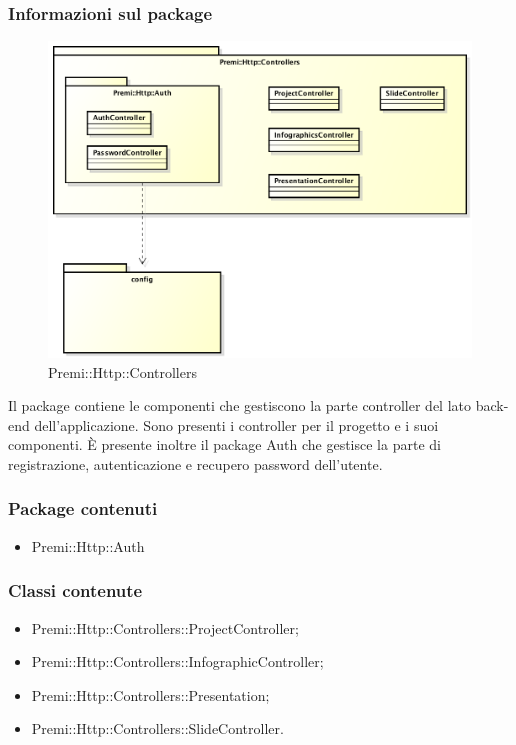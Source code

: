 	\subsubsection*{Informazioni sul package}
	\begin{figure}[h]
		\centering
		\includegraphics[width=0.9\linewidth]{img/premi_http_controllers}
		\caption[Premi::Http::Controllers]{Premi::Http::Controllers}
	\end{figure}
	Il package contiene le componenti che gestiscono la parte controller del lato \gls{back-end} dell'applicazione. 
	Sono presenti i controller per il progetto e i suoi componenti. È presente inoltre il package Auth che gestisce la parte di registrazione, autenticazione e recupero password dell'utente. 

	\subsubsection*{Package contenuti}
		\begin{itemize}
			\item Premi::Http::Auth
		\end{itemize}
	\subsubsection*{Classi contenute}
		\begin{itemize}
			\item Premi::Http::Controllers::ProjectController;
			\item Premi::Http::Controllers::InfographicController;
			\item Premi::Http::Controllers::Presentation;
			\item Premi::Http::Controllers::SlideController.
		\end{itemize}
		
